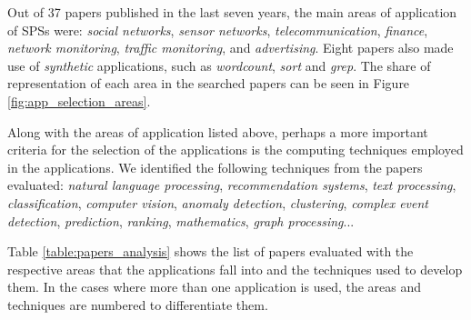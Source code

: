 \documentclass[ppgc,diss,english]{iiufrgs}
\begin{document}
Out of 37 papers published in the last seven years, the main areas of application of SPSs were: \emph{social networks}, \emph{sensor networks}, \emph{telecommunication}, \emph{finance}, \emph{network monitoring}, \emph{traffic monitoring}, and \emph{advertising}. Eight papers also made use of \emph{synthetic} applications, such as \emph{wordcount}, \emph{sort} and \emph{grep}. The share of representation of each area in the searched papers can be seen in Figure \ref{fig:app_selection_areas}.

Along with the areas of application listed above, perhaps a more important criteria for the selection of the applications is the computing techniques employed in the applications. We identified the following techniques from the papers evaluated: \emph{natural language processing}, \emph{recommendation systems}, \emph{text processing}, \emph{classification}, \emph{computer vision}, \emph{anomaly detection}, \emph{clustering}, \emph{complex event detection}, \emph{prediction}, \emph{ranking}, \emph{mathematics}, \emph{graph processing}...

Table \ref{table:papers_analysis} shows the list of papers evaluated with the respective areas that the applications fall into and the techniques used to develop them. In the cases where more than one application is used, the areas and techniques are numbered to differentiate them.


\end{document}
